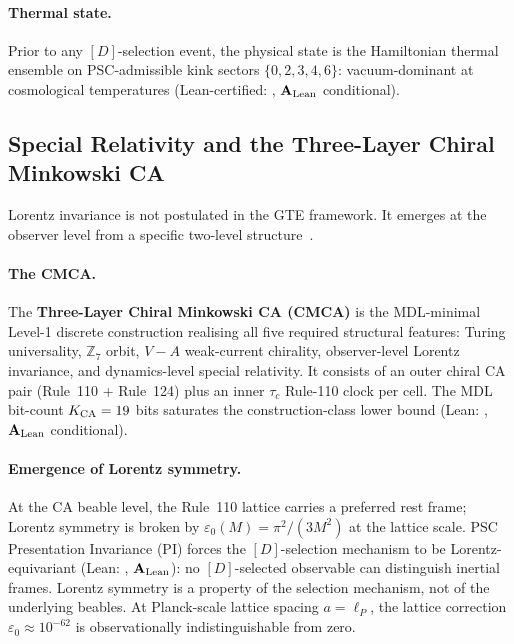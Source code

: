 \paragraph{Thermal state.}
Prior to any $[D]$-selection event, the physical state is the Hamiltonian thermal
ensemble on PSC-admissible kink sectors $\{0,2,3,4,6\}$: vacuum-dominant at
cosmological temperatures (Lean-certified: ,
$\mathbf{A}_{\rm Lean}$ conditional).

\subsection{Special Relativity and the Three-Layer Chiral Minkowski CA}
\label{subsec:overview-sr}

Lorentz invariance is not postulated in the GTE framework.  It emerges at the
observer level from a specific two-level structure~\cite{SpivackCMCA}.

\paragraph{The CMCA.}
The \textbf{Three-Layer Chiral Minkowski CA (CMCA)} is the MDL-minimal Level-1
discrete construction realising all five required structural features: Turing
universality, $\mathbb{Z}_7$ orbit, $V{-}A$ weak-current chirality, observer-level
Lorentz invariance, and dynamics-level special relativity.  It consists of an outer
chiral CA pair (Rule~110 + Rule~124) plus an inner $\tau_c$ Rule-110 clock per cell.
The MDL bit-count $K_{\rm CA} = 19$ bits saturates the construction-class lower bound
(Lean: , $\mathbf{A}_{\rm Lean}$ conditional).

\paragraph{Emergence of Lorentz symmetry.}
At the CA beable level, the Rule~110 lattice carries a preferred rest frame; Lorentz
symmetry is broken by $\varepsilon_0(M) = \pi^2/(3M^2)$ at the lattice scale.
PSC Presentation Invariance (PI) forces the $[D]$-selection mechanism to be
Lorentz-equivariant (Lean: , $\mathbf{A}_{\rm Lean}$):
no $[D]$-selected observable can distinguish inertial frames.  Lorentz symmetry is a
property of the selection mechanism, not of the underlying beables.  At Planck-scale
lattice spacing $a = \ell_P$, the lattice correction $\varepsilon_0 \approx 10^{-62}$
is observationally indistinguishable from zero.

